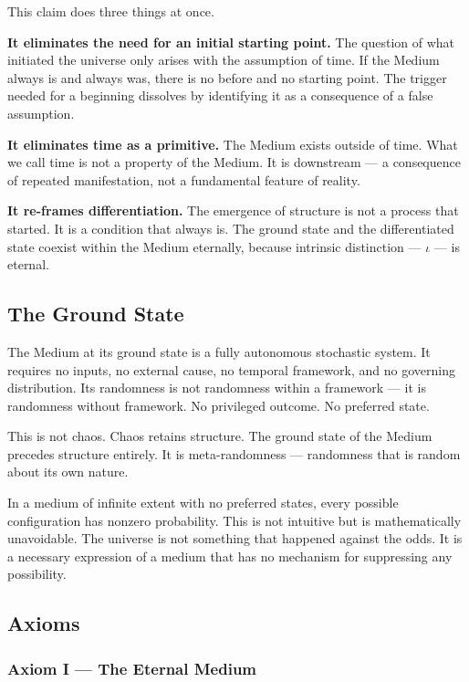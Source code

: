 \documentclass[11pt,letterpaper]{article}
\begin{document}
This claim does three things at once.

\textbf{It eliminates the need for an initial starting point.} The question of what initiated the universe only arises with the assumption of time. If the Medium always is and always was, there is no before and no starting point. The trigger needed for a beginning dissolves by identifying it as a consequence of a false assumption.

\textbf{It eliminates time as a primitive.} The Medium exists outside of time. What we call time is not a property of the Medium. It is downstream --- a consequence of repeated manifestation, not a fundamental feature of reality.

\textbf{It re-frames differentiation.} The emergence of structure is not a process that started. It is a condition that always is. The ground state and the differentiated state coexist within the Medium eternally, because intrinsic distinction --- \(\iota\) --- is eternal.

\subsection{The Ground State}
\label{sec:org308c075}

The Medium at its ground state is a fully autonomous stochastic system. It requires no inputs, no external cause, no temporal framework, and no governing distribution. Its randomness is not randomness within a framework --- it is randomness without framework. No privileged outcome. No preferred state.

This is not chaos. Chaos retains structure. The ground state of the Medium precedes structure entirely. It is meta-randomness --- randomness that is random about its own nature.

In a medium of infinite extent with no preferred states, every possible configuration has nonzero probability. This is not intuitive but is mathematically unavoidable. The universe is not something that happened against the odds. It is a necessary expression of a medium that has no mechanism for suppressing any possibility.

\subsection{Axioms}
\label{sec:orgdaaf91d}

\subsubsection{Axiom I --- The Eternal Medium}
\label{sec:orga8a9053}
\end{document}
